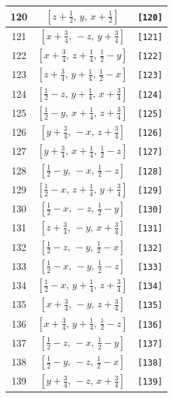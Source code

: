 \documentclass[fleqn,8pt]{jsarticle}
\begin{document}
\begin{longtable}{ccc}
120 & $\left[ z + \frac{1}{2},\, y,\, x + \frac{1}{2} \right]$ & {\tt [120]} \\ \hline
121 & $\left[ x + \frac{3}{4},\, - z,\, y + \frac{3}{4} \right]$ & {\tt [121]} \\ \hline
122 & $\left[ x + \frac{3}{4},\, z + \frac{1}{4},\, \frac{1}{2} - y \right]$ & {\tt [122]} \\ \hline
123 & $\left[ z + \frac{3}{4},\, y + \frac{1}{4},\, \frac{1}{2} - x \right]$ & {\tt [123]} \\ \hline
124 & $\left[ \frac{1}{2} - z,\, y + \frac{1}{4},\, x + \frac{3}{4} \right]$ & {\tt [124]} \\ \hline
125 & $\left[ \frac{1}{2} - y,\, x + \frac{1}{4},\, z + \frac{3}{4} \right]$ & {\tt [125]} \\ \hline
126 & $\left[ y + \frac{3}{4},\, - x,\, z + \frac{3}{4} \right]$ & {\tt [126]} \\ \hline
127 & $\left[ y + \frac{3}{4},\, x + \frac{1}{4},\, \frac{1}{2} - z \right]$ & {\tt [127]} \\ \hline
128 & $\left[ \frac{1}{2} - y,\, - x,\, \frac{1}{2} - z \right]$ & {\tt [128]} \\ \hline
129 & $\left[ \frac{1}{2} - x,\, z + \frac{1}{4},\, y + \frac{3}{4} \right]$ & {\tt [129]} \\ \hline
130 & $\left[ \frac{1}{2} - x,\, - z,\, \frac{1}{2} - y \right]$ & {\tt [130]} \\ \hline
131 & $\left[ z + \frac{3}{4},\, - y,\, x + \frac{3}{4} \right]$ & {\tt [131]} \\ \hline
132 & $\left[ \frac{1}{2} - z,\, - y,\, \frac{1}{2} - x \right]$ & {\tt [132]} \\ \hline
133 & $\left[ \frac{1}{2} - x,\, - y,\, \frac{1}{2} - z \right]$ & {\tt [133]} \\ \hline
134 & $\left[ \frac{1}{2} - x,\, y + \frac{1}{4},\, z + \frac{3}{4} \right]$ & {\tt [134]} \\ \hline
135 & $\left[ x + \frac{3}{4},\, - y,\, z + \frac{3}{4} \right]$ & {\tt [135]} \\ \hline
136 & $\left[ x + \frac{3}{4},\, y + \frac{1}{4},\, \frac{1}{2} - z \right]$ & {\tt [136]} \\ \hline
137 & $\left[ \frac{1}{2} - z,\, - x,\, \frac{1}{2} - y \right]$ & {\tt [137]} \\ \hline
138 & $\left[ \frac{1}{2} - y,\, - z,\, \frac{1}{2} - x \right]$ & {\tt [138]} \\ \hline
139 & $\left[ y + \frac{3}{4},\, - z,\, x + \frac{3}{4} \right]$ & {\tt [139]} \\ \hline

\end{longtable}
\end{document}
